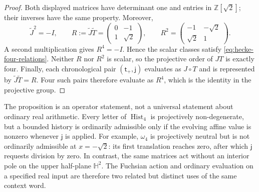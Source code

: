 \begin{proof}
Both displayed matrices have determinant one and entries in
$\mathbb Z[\sqrt2]$; their inverses have the same property.  Moreover,
\[
  \widetilde J^2=-I,
  \qquad
  R:=\widetilde J\widetilde T
    =\begin{pmatrix}0&-1\\1&\sqrt2\end{pmatrix},
  \qquad
  R^2=\begin{pmatrix}-1&-\sqrt2\\
                       \sqrt2&1\end{pmatrix}.
\]
A second multiplication gives $R^4=-I$.  Hence the scalar classes satisfy
\eqref{eq:hecke-four-relations}.  Neither $R$ nor $R^2$ is scalar, so the
projective order of $JT$ is exactly four.  Finally, each chronological pair
$(\mathsf t_+,\mathsf j)$ evaluates as $J\circ T$ and is represented by
$\widetilde J\widetilde T=R$.  Four such pairs therefore evaluate as $R^4$,
which is the identity in the projective group.
\end{proof}

The proposition is an operator statement, not a universal statement about
ordinary real arithmetic.  Every letter of $\operatorname{Hist}_4$ is
projectively non-degenerate, but a bounded history is ordinarily admissible
only if the evolving affine value is nonzero whenever $\mathsf j$ is applied.
For example, $\omega_4$ is projectively neutral but is not ordinarily
admissible at $x=-\sqrt2$: its first translation reaches zero, after which
$\mathsf j$ requests division by zero.  In contrast, the same matrices act
without an interior pole on the upper half-plane $\mathbb H^2$.  The Fuchsian
action and ordinary evaluation on a specified real input are therefore two
related but distinct uses of the same context word.

